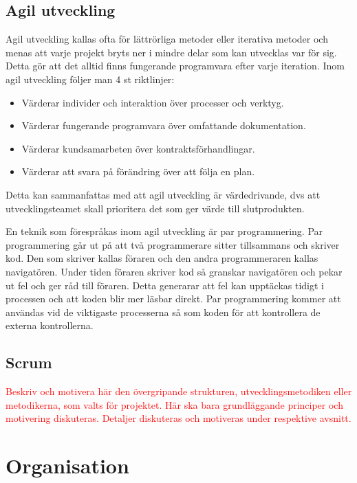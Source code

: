 \documentclass[a4paper,12pt,oneside,final]{extbook}
\begin{document}
\subsection{Agil utveckling}
Agil utveckling kallas ofta för lättrörliga metoder eller iterativa metoder och menas att varje projekt bryts ner i mindre delar som kan utvecklas var för sig. Detta gör att det alltid finns fungerande programvara efter varje iteration. Inom agil utveckling följer man 4 st riktlinjer\cite{Sewell2012asd}:

\begin{itemize}
	\item Värderar individer och interaktion över processer och verktyg.
	\item Värderar fungerande programvara över omfattande dokumentation.
	\item Värderar kundsamarbeten över kontraktsförhandlingar.
	\item Värderar att svara på förändring över att följa en plan.
\end{itemize}
Detta kan sammanfattas med att agil utveckling är värdedrivande, dvs att utvecklingsteamet skall prioritera det som ger värde till slutprodukten.


En teknik som förespråkas inom agil utveckling är par programmering\cite{Sewell2012asd}. Par programmering går ut på att två programmerare sitter tillsammans och skriver kod. Den som skriver kallas föraren och den andra programmeraren kallas navigatören. Under tiden föraren skriver kod så granskar navigatören och pekar ut fel och ger råd till föraren. Detta generarar att fel kan upptäckas tidigt i processen och att koden blir mer läsbar direkt. Par programmering kommer att användas vid de viktigaste processerna så som koden för att kontrollera de externa kontrollerna. 


\subsection{Scrum}

\textcolor{red}{Beskriv och motivera här den övergripande strukturen, utvecklingsmetodiken eller metodikerna, som
	valts för projektet. Här ska bara grundläggande principer och motivering diskuteras. Detaljer diskuteras
	och motiveras under respektive avsnitt.
}

\section{Organisation}
\end{document}
